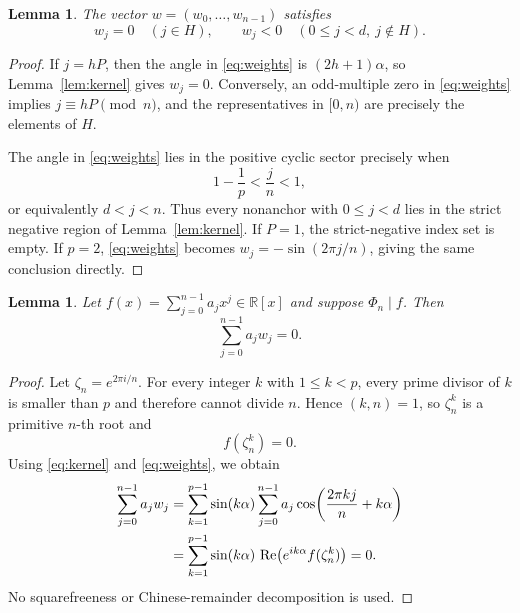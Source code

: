 \documentclass[11pt]{article}
\newtheorem{lemma}[theorem]{Lemma}
\numberwithin{equation}{section}
\begin{document}
\begin{lemma}\label{lem:sign}
The vector $w=(w_0,\ldots,w_{n-1})$ satisfies
\begin{equation}
w_j=0\quad(j\in H),
\qquad
w_j<0\quad(0\leq j<d,\ j\notin H).
\label{eq:sign}
\end{equation}
\end{lemma}

\begin{proof}
If $j=hP$, then the angle in \eqref{eq:weights} is $(2h+1)\alpha$, so
Lemma~\ref{lem:kernel} gives $w_j=0$. Conversely, an odd-multiple zero in
\eqref{eq:weights} implies $j\equiv hP\pmod n$, and the representatives in
$[0,n)$ are precisely the elements of $H$.

The angle in \eqref{eq:weights} lies in the positive cyclic sector precisely
when
\[
1-\frac1p<\frac jn<1,
\]
or equivalently $d<j<n$. Thus every nonanchor with $0\leq j<d$ lies in the
strict negative region of Lemma~\ref{lem:kernel}. If $P=1$, the
strict-negative index set is empty. If $p=2$, \eqref{eq:weights} becomes
$w_j=-\sin(2\pi j/n)$, giving the same conclusion directly.
\end{proof}

\begin{lemma}\label{lem:orthogonal}
Let $f(x)=\sum_{j=0}^{n-1}a_jx^j\in\mathbb R[x]$ and suppose
$\Phi_n\mid f$. Then
\begin{equation}
\sum_{j=0}^{n-1}a_jw_j=0.
\label{eq:orthogonal}
\end{equation}
\end{lemma}

\begin{proof}
Let $\zeta_n=e^{2\pi i/n}$. For every integer $k$ with $1\leq k<p$,
every prime divisor of $k$ is smaller than $p$ and therefore cannot divide
$n$. Hence $(k,n)=1$, so $\zeta_n^k$ is a primitive $n$-th root and
\begin{equation}
f(\zeta_n^k)=0.
\label{eq:root}
\end{equation}
Using \eqref{eq:kernel} and \eqref{eq:weights}, we obtain
\begin{align}
\sum_{j=0}^{n-1}a_jw_j
&=\sum_{k=1}^{p-1}\sin(k\alpha)
  \sum_{j=0}^{n-1}a_j
  \cos\!\left(\frac{2\pi kj}{n}+k\alpha\right)\notag\\
&=\sum_{k=1}^{p-1}\sin(k\alpha)\,
  \mathop{\rm Re}\!\left(e^{ik\alpha}f(\zeta_n^k)\right)=0.
\label{eq:fourier}
\end{align}
No squarefreeness or Chinese-remainder decomposition is used.
\end{proof}
\end{document}
